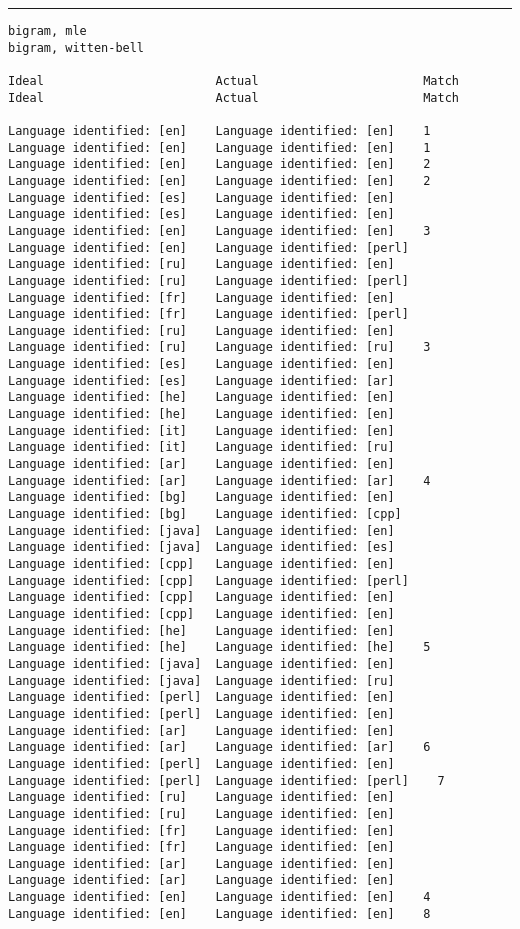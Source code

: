 \tiny
\hrule\vskip4pt
\begin{verbatim}
bigram, mle                                                       bigram, witten-bell

Ideal                        Actual                       Match   Ideal                        Actual                       Match

Language identified: [en]    Language identified: [en]    1       Language identified: [en]    Language identified: [en]    1
Language identified: [en]    Language identified: [en]    2       Language identified: [en]    Language identified: [en]    2
Language identified: [es]    Language identified: [en]            Language identified: [es]    Language identified: [en]
Language identified: [en]    Language identified: [en]    3       Language identified: [en]    Language identified: [perl]
Language identified: [ru]    Language identified: [en]            Language identified: [ru]    Language identified: [perl]
Language identified: [fr]    Language identified: [en]            Language identified: [fr]    Language identified: [perl]
Language identified: [ru]    Language identified: [en]            Language identified: [ru]    Language identified: [ru]    3
Language identified: [es]    Language identified: [en]            Language identified: [es]    Language identified: [ar]
Language identified: [he]    Language identified: [en]            Language identified: [he]    Language identified: [en]
Language identified: [it]    Language identified: [en]            Language identified: [it]    Language identified: [ru]
Language identified: [ar]    Language identified: [en]            Language identified: [ar]    Language identified: [ar]    4
Language identified: [bg]    Language identified: [en]            Language identified: [bg]    Language identified: [cpp]
Language identified: [java]  Language identified: [en]            Language identified: [java]  Language identified: [es]
Language identified: [cpp]   Language identified: [en]            Language identified: [cpp]   Language identified: [perl]
Language identified: [cpp]   Language identified: [en]            Language identified: [cpp]   Language identified: [en]
Language identified: [he]    Language identified: [en]            Language identified: [he]    Language identified: [he]    5
Language identified: [java]  Language identified: [en]            Language identified: [java]  Language identified: [ru]
Language identified: [perl]  Language identified: [en]            Language identified: [perl]  Language identified: [en]
Language identified: [ar]    Language identified: [en]            Language identified: [ar]    Language identified: [ar]    6
Language identified: [perl]  Language identified: [en]            Language identified: [perl]  Language identified: [perl]    7
Language identified: [ru]    Language identified: [en]            Language identified: [ru]    Language identified: [en]
Language identified: [fr]    Language identified: [en]            Language identified: [fr]    Language identified: [en]
Language identified: [ar]    Language identified: [en]            Language identified: [ar]    Language identified: [en]
Language identified: [en]    Language identified: [en]    4       Language identified: [en]    Language identified: [en]    8


\end{verbatim}
